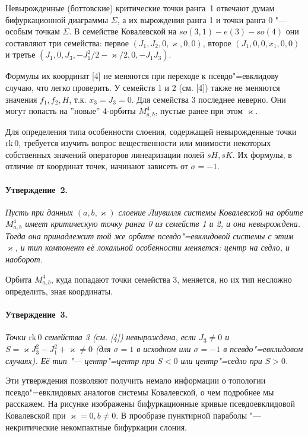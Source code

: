 Невырожденные (боттовские) критические точки ранга~1 отвечают думам бифуркационной диаграммы $\Sigma$, а их вырождения ранга 1 и точки ранга 0 "--- особым точкам $\Sigma$. В семействе Ковалевской на $so(3,1)-e(3)-so(4)$ они составляют три семейства: первое $(J_1, J_2, 0, \varkappa, 0 , 0)$, второе $(J_1, 0, 0, x_1, 0 , 0)$ и третье $(J_1, 0, J_3, -J_1^2/2 -\varkappa/2, 0 , -J_1 J_3)$.

Формулы их координат [4] не меняются при переходе к псевдо"=евклидову случаю, что легко проверить. У семейств 1 и 2 (см. [4]) также не меняются значения $f_1, f_2, H$, т.к. $x_3 = J_3 = 0$. Для семейства $3$ последнее неверно. Они могут попасть на ''новые'' 4-орбиты $M^4_{a, b}$, пустые ранее при этом $\varkappa$.

Для определения типа особенности слоения, содержащей невырожденные точки $\mathrm{rk}\,0$, требуется изучить вопрос вещественности или мнимости некоторых собственных значений операторов линеаризации полей $sH, sK$. Их формулы, в отличие от координат точек, начинают зависеть от $\sigma = -1$.

\paragraph{Утверждение~2.}
{\it
	Пусть при данных $(a, b, \varkappa)$ слоение Лиувилля системы Ковалевской на орбите $M^4_{a, b}$ имеет критическую точку ранга 0 из семейств 1 и 2, и она невырождена. Тогда она принадлежит той же орбите псевдо"=евклидовой системы с этим $\varkappa$, и тип компонент её локальной особенности меняется: центр на седло, и наоборот.
}

Орбита $M^4_{a, b}$, куда попадают точки семейства 3, меняется, но их тип несложно определить, зная координаты.

\paragraph{Утверждение~3.}
{\it
	Точки $\mathrm{rk}\,0$ семейства 3 (см. [4]) невырождена, если $J_3 \ne 0$ и $S = \varkappa J_3^2 - J_1^2 + \varkappa \ne 0$ (для $\sigma = 1$ в исходном или $\sigma = -1$ в псевдо"=евклидовом случаях). Её тип "--- центр"=центр при $S<0$ или центр"=седло при $S >0$.
}

Эти утверждения позволяют получить немало информации о топологии псевдо"=евклидовых аналогов системы Ковалевской, о чем подробнее мы расскажем. На рисунке изображены бифуркационные кривые псевдоевклидовой Ковалевской при $\varkappa = 0, b \ne 0$. В прообразе пунктирной параболы "--- некритические некомпактные бифуркации слония.

